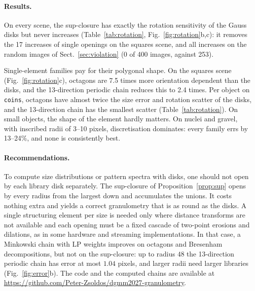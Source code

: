 \documentclass[runningheads]{llncs}
\begin{document}
\paragraph{Results.} On every scene, the sup-closure has exactly the rotation sensitivity of the Gauss disks but never increases (Table~\ref{tab:rotation}, Fig.~\ref{fig:rotation}b,c): it removes the 17 increases of single openings on the squares scene, and all increases on the random images of Sect.~\ref{sec:violation} (0 of 400 images, against 253).

Single-element families pay for their polygonal shape. On the squares scene (Fig.~\ref{fig:rotation}c), octagons are 7.5 times more orientation dependent than the disks, and the 13-direction periodic chain reduces this to 2.4 times. Per object on \texttt{coins}, octagons have almost twice the size error and rotation scatter of the disks, and the 13-direction chain has the smallest scatter (Table~\ref{tab:rotation}). On small objects, the shape of the element hardly matters. On nuclei and gravel, with inscribed radii of 3--10 pixels, discretisation dominates: every family errs by 13--24\%, and none is consistently best.

\paragraph{Recommendations.} To compute size distributions or pattern spectra with disks, one should not open by each library disk separately. The sup-closure of Proposition~\ref{prop:sup} opens by every radius from the largest down and accumulates the unions. It costs nothing extra and yields a correct granulometry that is as round as the disks. A single structuring element per size is needed only where distance transforms are not available and each opening must be a fixed cascade of two-point erosions and dilations, as in some hardware and streaming implementations. In that case, a Minkowski chain with LP weights improves on octagons and Bresenham decompositions, but not on the sup-closure: up to radius $48$ the 13-direction periodic chain has error at most $1.04$ pixels, and larger radii need larger libraries (Fig.~\ref{fig:error}b). The code and the computed chains are available at \url{https://github.com/Peter-Zsoldos/dgmm2027-granulometry}.

\end{document}
